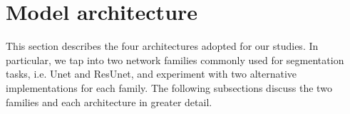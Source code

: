 \section{Model architecture}
\label{model_architecture}

This section describes the four architectures adopted for our studies.
In particular, we tap into two network families commonly used for segmentation tasks, i.e. Unet and ResUnet, and experiment with two alternative implementations for each family.
The following subsections discuss the two families and each architecture in greater detail.



